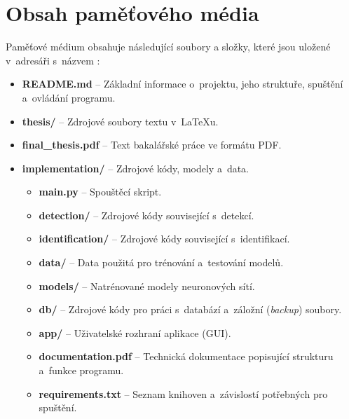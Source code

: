 
%

\chapter{Obsah paměťového média}
Paměťové médium obsahuje následující soubory a složky, které jsou uložené v~adresáři s~názvem :

\begin{itemize}
	\item \textbf{README.md} -- Základní informace o~projektu, jeho struktuře, spuštění a~ovládání programu.
	
	\item \textbf{thesis/} -- Zdrojové soubory textu v~\LaTeX{}u.
	
	\item \textbf{final\_thesis.pdf} -- Text bakalářské práce ve formátu PDF.
	
	\item \textbf{implementation/} -- Zdrojové kódy, modely a~data.
	\begin{itemize}
		\item \textbf{main.py} -- Spouštěcí skript.
		\item \textbf{detection/} -- Zdrojové kódy související s~detekcí.
		\item \textbf{identification/} -- Zdrojové kódy související s~identifikací.
		\item \textbf{data/} -- Data použitá pro trénování a~testování modelů.
		\item \textbf{models/} -- Natrénované modely neuronových sítí.
		\item \textbf{db/} -- Zdrojové kódy pro práci s~databází a~záložní (\textit{backup}) soubory.
		\item \textbf{app/} -- Uživatelské rozhraní aplikace (GUI).
		\item \textbf{documentation.pdf} -- Technická dokumentace popisující strukturu a~funkce programu.
		\item \textbf{requirements.txt} -- Seznam knihoven a~závislostí potřebných pro spuštění.
	\end{itemize}
	
\end{itemize}


%

